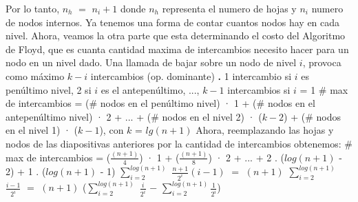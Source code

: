 \documentclass[10pt,a4paper]{article}
\begin{document}
\newline
\newline
Por lo tanto, $n_{h}$ $=$ $n_{i} + 1$ donde $n_{h}$ representa el numero de hojas y $n_{i}$ numero de nodos internos.
\newline
\newline
Ya tenemos una forma de contar cuantos nodos hay en cada nivel. Ahora, veamos la otra parte que esta determinando el costo del Algoritmo de Floyd, que es cuanta cantidad maxima de intercambios necesito hacer para un nodo en un nivel dado. 
\newline
\newline
Una llamada de bajar sobre un nodo de nivel $i$, provoca como máximo $k - i$ intercambios (op. dominante) 
\newline
\newline
\textbf{.} 1 intercambio si $i$ es penúltimo nivel, 2 si $i$ es el antepenúltimo, ..., $k-1$ intercambios si $i$ = 1
\newline
\newline
\# max de intercambios = 
\newline
\newline
(\# nodos en el penúltimo nivel) · 1 + (\# nodos en el antepenúltimo nivel) · 2 + ... + (\# nodos en el nivel 2) · ($k-2$) + 
\newline
\newline
(\# nodos en el nivel 1) · ($k-1$), con $k$ = $lg(n+1)$
\newline
\newline
\newline
\newline
\newline
Ahora, reemplazando las hojas y nodos de las diapositivas anteriores por la cantidad de intercambios obtenemos:
\newline
\newline
\# max de intercambios = 
\newline
\newline
($\displaystyle \frac{(n+1)}{4}$) · 1 + ($\displaystyle \frac{(n+1)}{8}$) · 2 + ... + 2 . ($log(n+1)$ - 2) + 1 . ($log(n+1)$ - 1) 
\newline
\newline
\newline
$\displaystyle \sum_{i=2}^{log(n+1)}$ $\displaystyle \frac{n+1}{2^{i}}(i-1)$ $=$ $(n+1)$ $\displaystyle \sum_{i=2}^{log(n+1)}$ $\displaystyle \frac{i-1}{2^{i}}$ $=$ $(n+1)$ ($\displaystyle \sum_{i=2}^{log(n+1)}$ $\displaystyle \frac{i}{2^{i}}$ $-$ $\displaystyle \sum_{i=2}^{log(n+1)} \displaystyle \frac{1}{2^{i}}$) 
\end{document}
